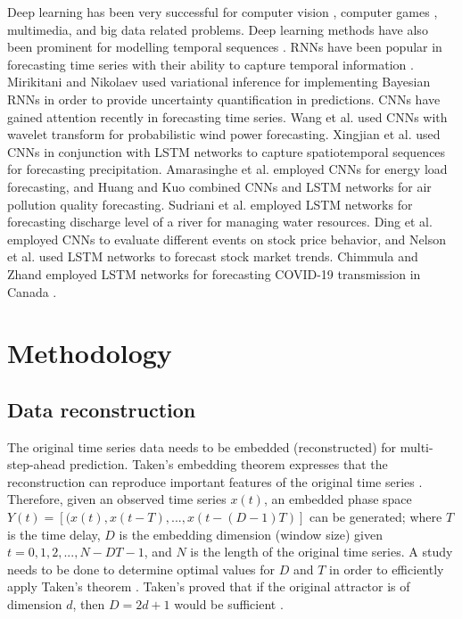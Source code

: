 \documentclass{ieeeaccess}
\begin{document}
Deep learning has  been very successful for computer vision \cite{he2016deep},  computer games \cite{mnih2013playing}, multimedia, and big data related problems. Deep learning  methods have also been prominent for modelling temporal sequences \cite{lecun2015deep,schmidhuber2015deep}. RNNs   have been popular in forecasting time series with their ability to capture temporal information \cite{connor1994recurrent,husken2003recurrent, chandra2012cooperative,chandra2015competition,SALINAS2020}.    Mirikitani and Nikolaev   used \cite{mirikitani2010recursive}  variational  inference  for implementing Bayesian RNNs in order to provide  uncertainty quantification in predictions. CNNs have gained attention recently in  forecasting time series. Wang et al.  \cite{wang2017deep}  used CNNs with  wavelet transform for  probabilistic wind power forecasting. Xingjian et al.   \cite{xingjian2015convolutional} used   CNNs  in conjunction with LSTM networks to capture spatiotemporal sequences   for forecasting precipitation. Amarasinghe et al. \cite{Amarasinghe2017Deepelf} employed  CNNs for   energy load forecasting, and  Huang and Kuo \cite{Huang2018CNN-LSTM} combined CNNs and LSTM networks for air pollution quality forecasting. 
Sudriani et al. \cite{sudriani2019long} employed  LSTM networks for forecasting discharge level of a river for  managing water resources. Ding et al. \cite{Ding2015} employed  CNNs to evaluate   different events on stock price behavior,  and  Nelson et al. \cite{nelson2017stock} used LSTM networks to forecast stock market trends. Chimmula and Zhand  employed LSTM networks for forecasting COVID-19 transmission in Canada  \cite{CHIMMULA2020}.  

 
 
\section{Methodology} 

\subsection{Data reconstruction }
   
The original time series data needs to be embedded (reconstructed) for    multi-step-ahead  
prediction. Taken's embedding theorem expresses that the
reconstruction can reproduce  important
features  of the original time series  \cite{Takens1981}. Therefore, given an 
observed time series $x(t)$, an embedded  phase
space $ Y(t) = [(x(t),
x(t-T),..., x(t-(D-1)T)]$ can be generated; where $T$ is the time delay, $D$ is
the embedding dimension (window size) given $t=  0,1,2,..., N-DT-1$, and $N$ is the length 
of the
original time series. A study needs to be done to determine optimal values for $D$ and $T$
 in order to efficiently apply Taken's theorem 
\cite{frazier2004}.   Taken's proved that if the original attractor is of
dimension $d$, then $D = 2d+1$ would be sufficient \cite{Takens1981}.    
\end{document}
